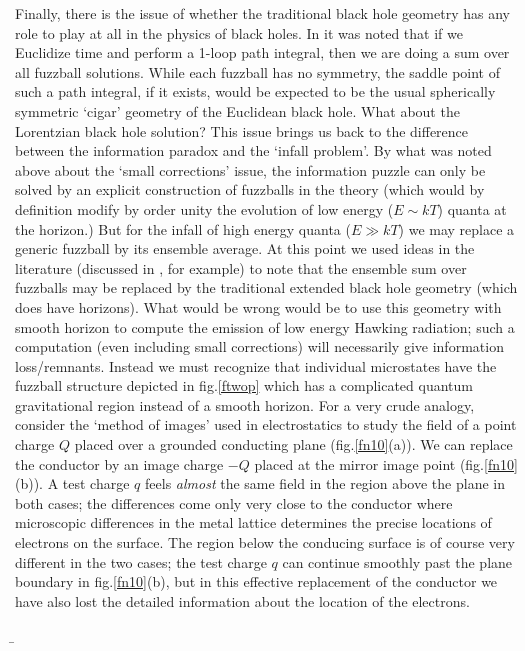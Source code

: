 \documentclass[12pt]{article}
\begin{document}
Finally, there is the issue of whether the traditional black hole geometry has any role to play at all in the physics of black holes. In \cite{phase} it was noted that if we Euclidize time and perform a 1-loop path integral, then we are doing a sum over all fuzzball solutions. While each fuzzball has no symmetry, the saddle point of such a path integral, if it exists, would be expected to be the usual spherically symmetric `cigar' geometry of the Euclidean black hole. What about the Lorentzian black hole solution? This issue brings us back to the difference between the information paradox and the `infall problem'. By what was noted above about the `small corrections' issue, the information puzzle can only be solved by an explicit  construction of fuzzballs in the theory (which would   by definition modify by order unity the evolution of low energy ($E\sim kT$) quanta at the horizon.) But for the infall of high energy quanta ($E\gg kT$) we may replace a generic fuzzball by its ensemble average. At this point we used ideas in the literature (discussed in \cite{israel2,maldacena2,raamsdonk}, for example) to note that the ensemble sum over fuzzballs  may be replaced by the traditional extended black hole geometry (which does have horizons). What would be wrong would be to use this geometry with smooth horizon to compute the emission of low energy Hawking radiation; such a computation (even including small corrections) will necessarily give information loss/remnants. Instead we must recognize that individual microstates have the fuzzball structure depicted in fig.\ref{ftwop} which has a complicated quantum gravitational region  instead of a smooth horizon.  For a very crude analogy, consider the `method of images' used in electrostatics to study the field of a point charge $Q$ placed over a grounded conducting plane (fig.\ref{fn10}(a)). We can replace the conductor by an image charge $-Q$ placed at the mirror image point (fig.\ref{fn10}(b)). A test charge $q$ feels {\it almost} the same field in the region above the plane in both cases; the differences come only very close to the conductor where microscopic differences in the metal lattice determines the precise locations of electrons on the surface. The region below the conducing surface is of course very different in the two cases;  the test charge $q$ can continue smoothly past the plane boundary in fig.\ref{fn10}(b), but in this effective replacement of the conductor we have also lost the detailed information about the location of the electrons.

\b
\end{document}
